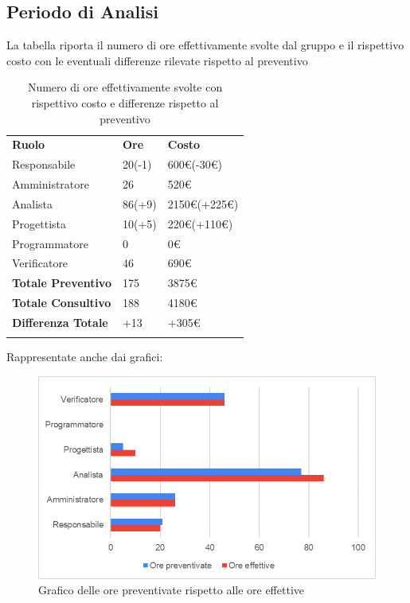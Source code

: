 	\subsection{Periodo di Analisi}
	La tabella riporta il numero di ore effettivamente svolte dal gruppo e il rispettivo costo con le eventuali differenze rilevate rispetto al preventivo
	\begin{longtable} {							
			>{}p{40mm}  
			>{}p{20mm}	
			>{}p{28mm}			
		}			
		\rowcolor{gray!50}
		
		\textbf{Ruolo} & \textbf{Ore} & \textbf{Costo} \TBstrut \\
		Responsabile & 20(-1) & 600\euro{}(-30\euro{}) \TBstrut \\
		Amministratore & 26 & 520\euro{} \TBstrut \\
		Analista & 86(+9)& 2150\euro{}(+225\euro{}) \TBstrut \\
		Progettista & 10(+5) & 220\euro{}(+110\euro{}) \TBstrut \\
		Programmatore & 0 & 0\euro{} \TBstrut \\
		Verificatore & 46 & 690\euro{} \TBstrut \\
		\textbf{Totale Preventivo} & 175 & 3875\euro{}	\TBstrut \\	
		\textbf{Totale Consultivo} & 188 & 4180\euro{}	\TBstrut \\	
		\textbf{Differenza Totale} & +13 & +305\euro{} \TBstrut \\
		\rowcolor{white}
		\caption{Numero di ore effettivamente svolte con rispettivo costo e differenze rispetto al preventivo}	
	\end{longtable}
	\pagebreak
	Rappresentate anche dai grafici:
	\begin{figure} [H]
		\includegraphics[width=\linewidth]{./img/Grafici/13.png}
		\caption{Grafico delle ore preventivate rispetto alle ore effettive}
	\end{figure}

